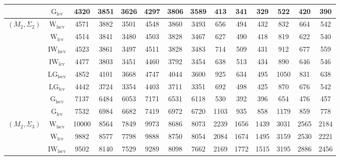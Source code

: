 \begin{table}[!ht]
{\begin{tabular}{@{}cc|ccc|ccc|ccc|ccc@{}}
 & $\mathrm{G}_{\mathrm{lcv}}$ & 4320 & 3851 & 3626 & 4297 & 3806 & 3589 & 413 & 341 & 329 & \cellcolor{black!10}522 & 420 & 390 \\ 
\midrule
$(M_2,\Sigma_2)$ & $\mathrm{W}_{\mathrm{lscv}}$ & 4571 & 3882 & 3501 & 4548 & 3860 & 3493 & 656 & 494 & 432 & 832 & 664 & 542 \\ 
 & $\mathrm{W}_{\mathrm{lcv}}$ & 4514 & 3841 & 3480 & 4503 & 3828 & 3467 & \cellcolor{black!10}627 & \cellcolor{black!10}490 & \cellcolor{black!10}418 & \cellcolor{black!10}819 & \cellcolor{black!10}622 & \cellcolor{black!10}540 \\ 
 & $\mathrm{IW}_{\mathrm{lscv}}$ & 4523 & 3861 & 3497 & 4511 & 3828 & 3483 & 714 & 509 & 431 & 912 & 677 & 559 \\ 
 & $\mathrm{IW}_{\mathrm{lcv}}$ & \cellcolor{black!10}4477 & \cellcolor{black!10}3803 & \cellcolor{black!10}3451 & \cellcolor{black!10}4460 & \cellcolor{black!10}3792 & \cellcolor{black!10}3454 & 638 & 513 & 434 & 890 & 646 & 546 \\ 
 & $\mathrm{LG}_{\mathrm{lscv}}$ & 4852 & 4101 & 3668 & 4747 & 4044 & 3600 & 925 & 634 & 495 & 1050 & 831 & 638 \\ 
 & $\mathrm{LG}_{\mathrm{lcv}}$ & \cellcolor{black!30}4442 & \cellcolor{black!30}3724 & \cellcolor{black!30}3354 & \cellcolor{black!30}4403 & \cellcolor{black!30}3711 & \cellcolor{black!30}3351 & 692 & 498 & 425 & 870 & 676 & 542 \\ 
 & $\mathrm{G}_{\mathrm{lscv}}$ & 7137 & 6484 & 6053 & 7171 & 6531 & 6118 & \cellcolor{black!30}530 & \cellcolor{black!30}392 & \cellcolor{black!30}396 & \cellcolor{black!30}654 & \cellcolor{black!30}476 & \cellcolor{black!30}457 \\ 
 & $\mathrm{G}_{\mathrm{lcv}}$ & 7532 & 6984 & 6682 & 7419 & 6972 & 6720 & 1103 & 935 & 858 & 1179 & 859 & 778 \\ 
\midrule
$(M_2,\Sigma_3)$ & $\mathrm{W}_{\mathrm{lscv}}$ & 10000 & 8564 & 7849 & 9973 & 8686 & 8073 & 2239 & \cellcolor{black!10}1656 & \cellcolor{black!10}1439 & \cellcolor{black!10}3031 & 2565 & \cellcolor{black!10}2184 \\ 
 & $\mathrm{W}_{\mathrm{lcv}}$ & 9882 & 8577 & 7798 & 9888 & 8750 & 8054 & \cellcolor{black!10}2084 & 1674 & 1495 & 3159 & 2530 & 2221 \\ 
 & $\mathrm{IW}_{\mathrm{lscv}}$ & \cellcolor{black!10}9502 & \cellcolor{black!10}8140 & \cellcolor{black!10}7529 & \cellcolor{black!10}9289 & \cellcolor{black!30}8098 & \cellcolor{black!30}7662 & 2169 & 1772 & 1515 & 3195 & 2886 & 2456 \\ 

\end{tabular}}
\end{table}
